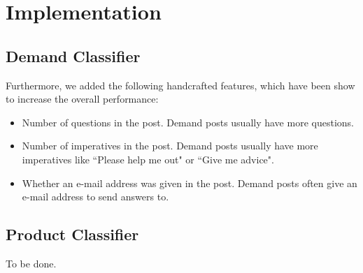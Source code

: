 
\section{Implementation}
\label{sec:implementation}

\subsection{Demand Classifier}

Furthermore, we added the following handcrafted  features, which have been show to increase the overall performance:
\begin{itemize}
	\item Number of questions in the post. Demand posts usually have more questions.
	\item Number of imperatives in the post. Demand posts usually have more imperatives like ``Please help me out" or ``Give me advice".
	\item Whether an e-mail address was given in the post. Demand posts often give an e-mail address to send answers to.
\end{itemize}

\subsection{Product Classifier}
To be done.
